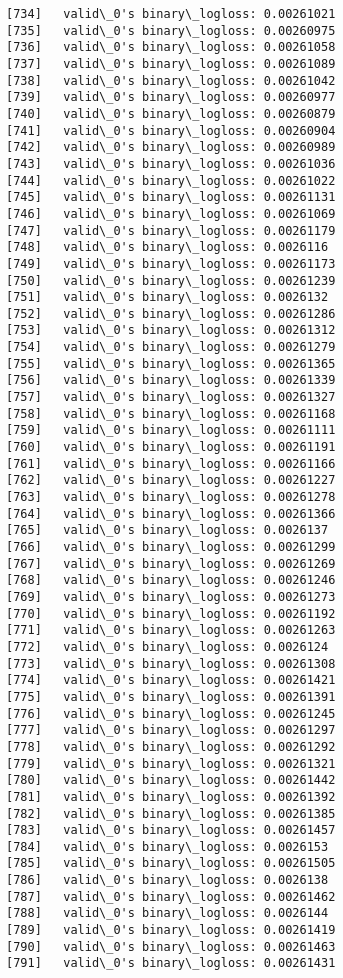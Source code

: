 \documentclass[11pt]{article}
\begin{document}
\begin{Verbatim}[commandchars=\\\{\}]
[734]	valid\_0's binary\_logloss: 0.00261021
[735]	valid\_0's binary\_logloss: 0.00260975
[736]	valid\_0's binary\_logloss: 0.00261058
[737]	valid\_0's binary\_logloss: 0.00261089
[738]	valid\_0's binary\_logloss: 0.00261042
[739]	valid\_0's binary\_logloss: 0.00260977
[740]	valid\_0's binary\_logloss: 0.00260879
[741]	valid\_0's binary\_logloss: 0.00260904
[742]	valid\_0's binary\_logloss: 0.00260989
[743]	valid\_0's binary\_logloss: 0.00261036
[744]	valid\_0's binary\_logloss: 0.00261022
[745]	valid\_0's binary\_logloss: 0.00261131
[746]	valid\_0's binary\_logloss: 0.00261069
[747]	valid\_0's binary\_logloss: 0.00261179
[748]	valid\_0's binary\_logloss: 0.0026116
[749]	valid\_0's binary\_logloss: 0.00261173
[750]	valid\_0's binary\_logloss: 0.00261239
[751]	valid\_0's binary\_logloss: 0.0026132
[752]	valid\_0's binary\_logloss: 0.00261286
[753]	valid\_0's binary\_logloss: 0.00261312
[754]	valid\_0's binary\_logloss: 0.00261279
[755]	valid\_0's binary\_logloss: 0.00261365
[756]	valid\_0's binary\_logloss: 0.00261339
[757]	valid\_0's binary\_logloss: 0.00261327
[758]	valid\_0's binary\_logloss: 0.00261168
[759]	valid\_0's binary\_logloss: 0.00261111
[760]	valid\_0's binary\_logloss: 0.00261191
[761]	valid\_0's binary\_logloss: 0.00261166
[762]	valid\_0's binary\_logloss: 0.00261227
[763]	valid\_0's binary\_logloss: 0.00261278
[764]	valid\_0's binary\_logloss: 0.00261366
[765]	valid\_0's binary\_logloss: 0.0026137
[766]	valid\_0's binary\_logloss: 0.00261299
[767]	valid\_0's binary\_logloss: 0.00261269
[768]	valid\_0's binary\_logloss: 0.00261246
[769]	valid\_0's binary\_logloss: 0.00261273
[770]	valid\_0's binary\_logloss: 0.00261192
[771]	valid\_0's binary\_logloss: 0.00261263
[772]	valid\_0's binary\_logloss: 0.0026124
[773]	valid\_0's binary\_logloss: 0.00261308
[774]	valid\_0's binary\_logloss: 0.00261421
[775]	valid\_0's binary\_logloss: 0.00261391
[776]	valid\_0's binary\_logloss: 0.00261245
[777]	valid\_0's binary\_logloss: 0.00261297
[778]	valid\_0's binary\_logloss: 0.00261292
[779]	valid\_0's binary\_logloss: 0.00261321
[780]	valid\_0's binary\_logloss: 0.00261442
[781]	valid\_0's binary\_logloss: 0.00261392
[782]	valid\_0's binary\_logloss: 0.00261385
[783]	valid\_0's binary\_logloss: 0.00261457
[784]	valid\_0's binary\_logloss: 0.0026153
[785]	valid\_0's binary\_logloss: 0.00261505
[786]	valid\_0's binary\_logloss: 0.0026138
[787]	valid\_0's binary\_logloss: 0.00261462
[788]	valid\_0's binary\_logloss: 0.0026144
[789]	valid\_0's binary\_logloss: 0.00261419
[790]	valid\_0's binary\_logloss: 0.00261463
[791]	valid\_0's binary\_logloss: 0.00261431

\end{Verbatim}
\end{document}
